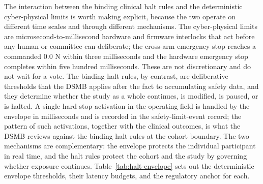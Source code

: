The interaction between the binding clinical halt rules and the deterministic
cyber-physical limits is worth making explicit, because the two operate on different
time scales and through different mechanisms. The cyber-physical limits are
microsecond-to-millisecond hardware and firmware interlocks that act before any human
or committee can deliberate; the cross-arm emergency stop reaches a commanded 0.0 N
within three milliseconds and the hardware emergency stop completes within five
hundred milliseconds. These are not discretionary and do not wait for a vote. The
binding halt rules, by contrast, are deliberative thresholds that the DSMB applies
after the fact to accumulating safety data, and they determine whether the study as a
whole continues, is modified, is paused, or is halted. A single hard-stop activation
in the operating field is handled by the envelope in milliseconds and is recorded in
the safety-limit-event record; the pattern of such activations, together with the
clinical outcomes, is what the DSMB reviews against the binding halt rules at the
cohort boundary. The two mechanisms are complementary: the envelope protects the
individual participant in real time, and the halt rules protect the cohort and the
study by governing whether exposure continues. Table~\ref{tab:halt-envelope} sets out
the deterministic envelope thresholds, their latency budgets, and the regulatory
anchor for each.

